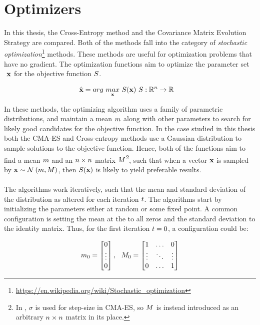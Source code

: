 \section{Optimizers}

In this thesis, the Cross-Entropy method and the Covariance Matrix Evolution 
Strategy are compared. Both of the methods fall into the category of 
\textit{stochastic optimization}\footnote{\url{https://en.wikipedia.org/wiki/Stochastic_optimization}}
methods. These methods are useful for optimization problems that have no gradient.
The optimization functions aim to optimize the parameter set $\textbf{ \individual }$
for the objective function $S$.

\begin{align*}
\hat{\textbf{\individual }} &= 
arg \  \underset{\textbf{\individual }}{max} \  
\fitnessFunction (\textbf{\individual }) \ 
\fitnessFunction : \mathbb{R}^{\dimensions } \rightarrow \mathbb{R}
\end{align*}

In these methods, the optimizing algorithm uses a family of parametric distributions,
and maintain a mean $m $ along with other parameters
to search for likely good candidates for the objective function.  
In the case studied in this thesis
both the CMA-ES and Cross-entropy methods use a 
Gaussian distribution to sample solutions to the objective function.
Hence, both of the functions aim to find a mean 
$m $ and an $n \times n$ matrix 
$M $\footnote{In \citep{hansen2011}, 
$\sigma$ is used for step-size in CMA-ES, so $M $ is instead introduced
as an arbitrary $n \times n$ matrix in its place.}, such that when
a vector $\textbf{\individual }$ is sampled by 
$\textbf{x} \sim \mathcal{N}\left( m, M \right)$, 
then $S (\textbf{x})$ 
is likely to yield preferable results.\\
\\
The algorithms work iteratively, such that the mean and standard deviation of the distribution 
as altered for each iteration $t $.
The algorithms start by initializing the parameters either at random or some fixed point. A common 
configuration is setting the mean at the to all zeros and the standard deviation to the identity matrix.
Thus, for the first iteration $t = 0$, a configuration could be:

\begin{align*}
\mean_{0} =
\begin{bmatrix}
0\\
\vdots\\
0
\end{bmatrix},\ \ 
\varianceMatrix _{0} = 
\begin{bmatrix}
1 & \hdots & 0\\
\vdots & \ddots & \vdots\\
0 & \hdots & 1
\end{bmatrix}
\end{align*}

